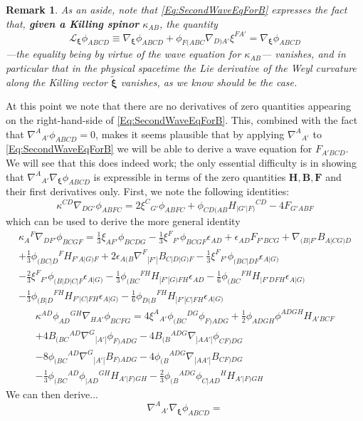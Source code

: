 \documentclass[10pt,a4paper]{article}
\theoremstyle{plain}
\newtheorem{remark}{Remark}
\def\bmB{{\bm B}}
\def\bmF{{\bm F}}
\def\bmH{{\bm H}}
\def\bmB{{\bm B}}
\def\bmF{{\bm F}}
\def\bmH{{\bm H}}
\begin{document}
\begin{remark}{\em}
As an aside, note that \eqref{Eq:SecondWaveEqForB} expresses the fact that, \textbf{given a Killing spinor} $\kappa_{AB}$, the quantity 
\[\mathcal{L}_{\bm\xi}\phi_{ABCD}\equiv \nabla_{\bm\xi}\phi_{ABCD} + \phi_{F(ABC}\nabla_{D)A'}\xi^{FA'} = \nabla_{\bm\xi}\phi_{ABCD} \]
---the equality being by virtue of the wave equation for $\kappa_{AB}$--- vanishes, and in particular that in the physical spacetime the Lie derivative of the Weyl curvature along the Killing vector $\tilde{\bm\xi}$ vanishes, as we know should be the case.
\end{remark}

At this point we note that there are no derivatives of zero quantities appearing on the right-hand-side of \eqref{Eq:SecondWaveEqForB}. This, combined with the fact that $\nabla^A{}_{A'}\phi_{ABCD}=0$, makes it seems plausible that by applying $\nabla^A{}_{A'}$ to \eqref{Eq:SecondWaveEqForB} we will be able to derive a wave equation for $F_{A'BCD}$. We will see that this does indeed work; the only essential difficulty is in showing that $\nabla^A{}_{A'}\nabla_{\bm\xi}\phi_{ABCD}$ is expressible in terms of the zero quantities $\bmH, \bmB, \bmF$ and their first derivatives only. First, we note the following identities:
\[ \kappa^{CD} \nabla_{DG'}\phi_{ABFC} = 2 \xi^{C}{}_{G'} \phi_{ABFC} +  \phi_{CD(AB} H_{\vert G'\vert F)}{}^{CD} - 4 F_{G'ABF}\]
which can be used to derive the more general identity
\begin{multline}
    \kappa_{A}{}^{F} \nabla_{DF'}\phi_{BCGF} = \tfrac{1}{3} \xi_{AF'} \phi_{BCDG} -  \tfrac{1}{3} \xi^{F}{}_{F'} \phi_{BCGF} \epsilon_{AD} +  \epsilon_{AD} F_{F'BCG} + \nabla_{(B|F'}B_{A|CG)D} \\ + \tfrac{1}{3} \phi_{(BC|D}{}^{F}H_{F'A|G)F} + 2 \epsilon_{A(B}\nabla^{F}{}_{|F'|}B_{C|D|G)F} -  \tfrac{1}{3} \xi^{F}{}_{F'}\phi_{(BC|DF}\epsilon_{A|G)} \\
    -  \tfrac{2}{3} \xi^{F}{}_{F'}\phi_{(B|D|C|F}\epsilon_{A|G)} -  \tfrac{1}{3} \phi_{(BC}{}^{FH}H_{|F'|G)FH}\epsilon_{AD} -  \tfrac{1}{6} \phi_{(BC}{}^{FH}H_{|F'DFH}\epsilon_{A|G)} \\
    -  \tfrac{1}{3} \phi_{(B|D}{}^{FH}H_{F'|C|FH}\epsilon_{A|G)} -  \tfrac{1}{6} \phi_{D(B}{}^{FH}H_{|F'|C|FH}\epsilon_{A|G)}
\end{multline}
\begin{multline}
    \kappa^{AD} \phi_{AD}{}^{GH} \nabla_{HA'}\phi_{BCFG} =  4 \xi^{A}{}_{A'}\phi_{(BC}{}^{DG}\phi_{F)ADG} + \tfrac{1}{2} \phi_{ADGH} \phi^{ADGH} H_{A'BCF} \\ + 4 B_{(BC}{}^{AD}\nabla^{G}{}_{|A'|}\phi_{F)ADG} - 4 B_{(B}{}^{ADG}\nabla_{|AA'|}\phi_{CF)DG} \\- 8 \phi_{(BC}{}^{AD}\nabla^{G}{}_{|A'|}B_{F)ADG} - 4 \phi_{(B}{}^{ADG}\nabla_{|AA'|}B_{CF)DG}  \\-  \tfrac{1}{3} \phi_{(BC}{}^{AD}\phi_{|AD}{}^{GH}H_{A'|F)GH} -  \tfrac{2}{3} \phi_{(B}{}^{ADG}\phi_{C|AD}{}^{H}H_{A'|F)GH}
\end{multline}
We can then derive...
\begin{equation}
    \nabla^A{}_{A'}\nabla_{\bm\xi}\phi_{ABCD} = 
\end{equation}
\end{document}
